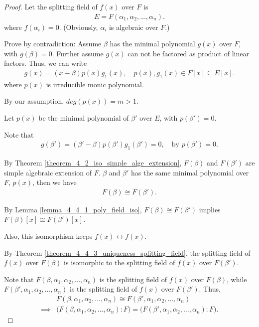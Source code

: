 \documentclass[utf8]{ctexbook}
\theoremstyle{definition}
\begin{document}
\begin{proof}
Let the splitting field of $f(x)$ over $F$ is
\begin{align*}
E = F(\alpha_1 , \alpha_2, \ldots, \alpha_n).
\end{align*}
where $f(\alpha_i) = 0$. (Obviously, $\alpha_i$ is algebraic over $F$.)

Prove by contradiction: Assume $\beta$ has the minimal polynomial $g(x)$ over $F$, with $g(\beta)=0$. Further assume $g(x)$ can not be factored as product of linear factors. Thus, we can write
\begin{align*}
g(x) = (x- \beta) p(x) g_1 (x), \quad p(x), g_1 (x) \in F[x] \subseteq E[x].
\end{align*}
where $p(x)$ is irreducible monic polynomial.

By our assumption, $deg(p(x)) = m > 1$.

Let $p(x)$ be the minimal polynomial of $\beta'$ over $E$, with $p(\beta') = 0$. 

Note that
\begin{align*}
g(\beta') = (\beta' - \beta) p(\beta') g_1 (\beta') = 0, \quad \mbox{by } p(\beta') = 0 .
\end{align*}

By Theorem \ref{theorem_4_2_iso_simple_alge_extension}, $F(\beta)$ and $F(\beta')$ are simple algebraic extension of $F$. $\beta$ and $\beta'$ has the same minimal polynomial over $F$, $p(x)$, then we have
\begin{align*}
F(\beta) \cong F(\beta') .
\end{align*}

By Lemma \ref{lemma_4_4_1_poly_field_iso}, $F(\beta) \cong F(\beta')$ implies $F(\beta)[x] \cong F(\beta')[x]$. 

Also, this isomorphism keeps $f(x) \longleftrightarrow f(x)$.

By Theorem \ref{theorem_4_4_3_uniqueness_splitting_field}, the splitting field of $f(x)$ over $F(\beta)$ is isomorphic to the splitting field of $f(x)$ over $F(\beta')$.

Note that $F(\beta, \alpha_1, \alpha_2, \ldots, \alpha_n)$ is the splitting field of $f(x)$ over $F(\beta)$, while $F(\beta', \alpha_1, \alpha_2, \ldots, \alpha_n)$ is the splitting field of $f(x)$ over $F(\beta')$. Thus,
\begin{align*}
& F(\beta, \alpha_1, \alpha_2, \ldots, \alpha_n) \cong F(\beta', \alpha_1, \alpha_2, \ldots, \alpha_n) \\
\implies & \big( F(\beta, \alpha_1, \alpha_2, \ldots, \alpha_n) : F\big)  = \big( F(\beta', \alpha_1, \alpha_2, \ldots, \alpha_n) : F \big) .
\end{align*} 


\end{proof}
\end{document}
